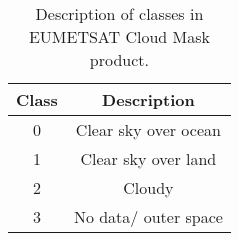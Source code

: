 \begin{table}[]
    \centering
    \setlength\extrarowheight{-7pt}
    \begin{tabular}{c|c}
        Class & Description \\ \hline
        0 & Clear sky over ocean \\
        1 & Clear sky over land \\
        2 & Cloudy \\
        3 & No data/ outer space        
    \end{tabular}
    \caption{Description of classes in EUMETSAT Cloud Mask product.}
    \label{tab:classes_clm}
\end{table}